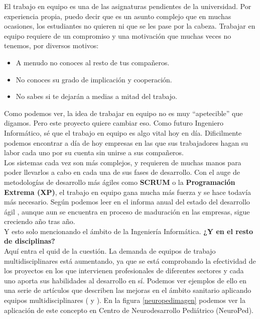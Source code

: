El trabajo en equipo es una de las asignaturas pendientes de la universidad. Por experiencia propia, puedo decir que es un asunto complejo que en muchas ocasiones, los estudiantes no quieren ni que se les pase por la cabeza. Trabajar en equipo requiere de un compromiso y una motivación que muchas veces no tenemos, por diversos motivos:

\begin{itemize}
    \item A menudo no conoces al resto de tus compañeros.
    \item No conoces su grado de implicación y cooperación.
    \item No sabes si te dejarán a medias a mitad del trabajo.
\end{itemize}

Como podemos ver, la idea de trabajar en equipo no es muy ``apetecible'' que digamos. Pero este proyecto quiere cambiar eso. Como futuro Ingeniero Informático, sé que el trabajo en equipo es algo vital hoy en día. Dificilmente podemos encontrar a día de hoy empresas en las que sus trabajadores hagan su labor cada uno por su cuenta sin unirse a sus compañeros.\\

Los sistemas cada vez son más complejos, y requieren de muchas manos para poder llevarlos a cabo en cada una de sus fases de desarrollo. Con el auge de metodologías de desarrollo más ágiles como \textbf{SCRUM} o la \textbf{Programación Extrema (XP)}, el trabajo en equipo gana mucha más fuerza y se hace todavía más necesario. Según podemos leer en el informa anual del estado del desarrollo ágil \cite{agilereport}, aunque aun se encuentra en proceso de maduración en las empresas, sigue creciendo año tras año.\\

Y esto solo mencionando el ámbito de la Ingeniería Informática. \textbf{¿Y en el resto de disciplinas?}\\

Aquí entra el quid de la cuestión. La demanda de equipos de trabajo multidisciplinares está aumentando, ya que se está comprobando la efectividad de los proyectos en los que intervienen profesionales de diferentes sectores y cada uno aporta sus habilidades al desarrollo en sí. Podemos ver ejemplos de ello en una serie de artículos que describen las mejoras en el ámbito sanitario aplicando equipos multidisciplinares (\cite{health1} y \cite{health2}). En la figura \ref{neuropedimagen} podemos ver la aplicación de este concepto en Centro de Neurodesarrollo Pediátrico (NeuroPed).\\

